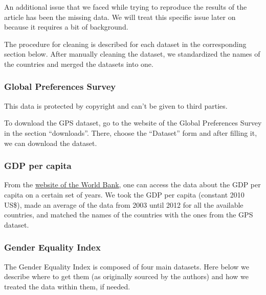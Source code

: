 \documentclass[
  11pt,
]{article}
\begin{document}
An additional issue that we faced while trying to reproduce the results
of the article has been the missing data. We will treat this specific
issue later on because it requires a bit of background.

The procedure for cleaning is described for each dataset in the
corresponding section below. After manually cleaning the dataset, we
standardized the names of the countries and merged the datasets into
one.

\hypertarget{global-preferences-survey}{%
\subsubsection{Global Preferences
Survey}\label{global-preferences-survey}}

This data is protected by copyright and can't be given to third parties.

To download the GPS dataset, go to the website of the Global Preferences
Survey in the section ``downloads''. There, choose the ``Dataset'' form
and after filling it, we can download the dataset.

\hypertarget{gdp-per-capita}{%
\subsubsection{GDP per capita}\label{gdp-per-capita}}

From the \href{https://data.worldbank.org/indicator/}{website of the
World Bank}, one can access the data about the GDP per capita on a
certain set of years. We took the GDP per capita (constant 2010 US\$),
made an average of the data from 2003 until 2012 for all the available
countries, and matched the names of the countries with the ones from the
GPS dataset.

\hypertarget{gender-equality-index}{%
\subsubsection{Gender Equality Index}\label{gender-equality-index}}

The Gender Equality Index is composed of four main datasets. Here below
we describe where to get them (as originally sourced by the authors) and
how we treated the data within them, if needed.
\end{document}
